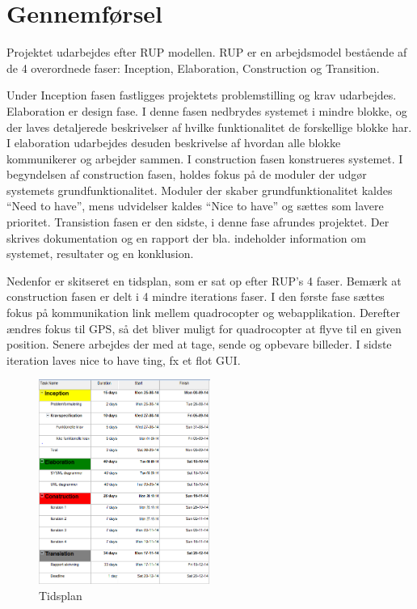 \chapter{Gennemførsel}

\vspace{-10pt}

Projektet udarbejdes efter RUP modellen. RUP er en arbejdsmodel bestående af de 4 overordnede faser: Inception, Elaboration, Construction og Transition.

Under Inception fasen fastligges projektets problemstilling og krav udarbejdes.
Elaboration er design fase. I denne fasen nedbrydes systemet i mindre blokke, 
og der laves detaljerede beskrivelser af hvilke funktionalitet de forskellige blokke har.
I elaboration udarbejdes desuden beskrivelse af hvordan alle blokke kommunikerer og arbejder sammen.  
I construction fasen konstrueres systemet. I begyndelsen af construction fasen, holdes fokus på de
moduler der udgør systemets grundfunktionalitet. Moduler der skaber grundfunktionalitet kaldes “Need to have”, mens udvidelser kaldes “Nice to have” og sættes som lavere prioritet.
Transistion fasen er den sidste, i denne fase afrundes projektet. Der skrives dokumentation og en rapport der bla. indeholder information om systemet, resultater og en konklusion.


Nedenfor er skitseret en tidsplan, som er sat op efter RUP's 4 faser.
Bemærk at construction fasen er delt i 4 mindre iterations faser.
I den første fase sættes fokus på kommunikation link mellem quadrocopter og webapplikation.
Derefter ændres fokus til GPS, så det bliver muligt for quadrocopter at flyve til en given position.
Senere arbejdes der med at tage, sende og opbevare billeder.
I sidste iteration laves nice to have ting, fx et flot GUI.



\begin{figure}[H]
\centering
\includegraphics[width=0.5\textwidth]{Billeder/Tidsplan.png}
\caption{Tidsplan}
\label{fig:Tidsplan}
\end{figure}

